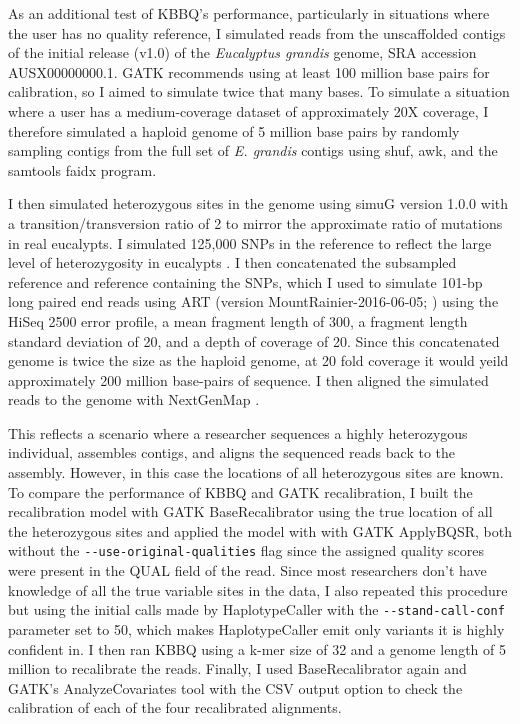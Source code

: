 As an additional test of KBBQ's performance, particularly in situations where the user has no quality reference, I simulated reads from the unscaffolded contigs of the initial release (v1.0) of the \textit{Eucalyptus grandis} genome, SRA accession AUSX00000000.1. GATK recommends using at least 100 million base pairs for calibration, so I aimed to simulate twice that many bases. To simulate a situation where a user has a medium-coverage dataset of approximately 20X coverage, I therefore simulated a haploid genome of 5 million base pairs by randomly sampling contigs from the full set of \textit{E. grandis} contigs using shuf, awk, and the samtools faidx program.

I then simulated heterozygous sites in the genome using simuG version 1.0.0 \parencite{yue_simug_2019} with a transition/transversion ratio of 2 to mirror the approximate ratio of mutations in real eucalypts. I simulated 125,000 SNPs in the reference to reflect the large level of heterozygosity in eucalypts \parencite{kulheim_comparative_2009}. I then concatenated the subsampled reference and reference containing the SNPs, which I used to simulate 101-bp long paired end reads using ART (version MountRainier-2016-06-05; \cite{huang_art_2012}) using the HiSeq 2500 error profile, a mean fragment length of 300, a fragment length standard deviation of 20, and a depth of coverage of 20. Since this concatenated genome is twice the size as the haploid genome, at 20 fold coverage it would yeild approximately 200 million base-pairs of sequence. I then aligned the simulated reads to the genome with NextGenMap \parencite{sedlazeck_nextgenmap_2013}.

This reflects a scenario where a researcher sequences a highly heterozygous individual, assembles contigs, and aligns the sequenced reads back to the assembly. However, in this case the locations of all heterozygous sites are known. To compare the performance of KBBQ and GATK recalibration, I built the recalibration model with GATK BaseRecalibrator using the true location of all the heterozygous sites and applied the model with with GATK ApplyBQSR, both without the \texttt{-\phantom{}-use-original-qualities} flag since the assigned quality scores were present in the QUAL field of the read. Since most researchers don't have knowledge of all the true variable sites in the data, I also repeated this procedure but using the initial calls made by HaplotypeCaller with the \texttt{-\phantom{}-stand-call-conf} parameter set to 50, which makes HaplotypeCaller emit only variants it is highly confident in. I then ran KBBQ using a k-mer size of 32 and a genome length of 5 million to recalibrate the reads. Finally, I used BaseRecalibrator again and GATK's AnalyzeCovariates tool with the CSV output option to check the calibration of each of the four recalibrated alignments.

